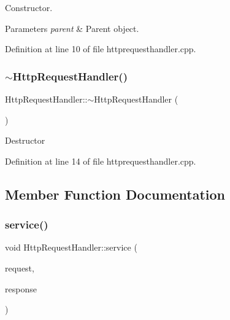 Constructor. 
\begin{DoxyParams}{Parameters}
{\em parent} & Parent object. \\
\hline
\end{DoxyParams}


Definition at line 10 of file httprequesthandler.\+cpp.

\mbox{\label{classstefanfrings_1_1_http_request_handler_a32bf6b0e36dbdb4cd0525d2c4b54fdec}} 
\subsubsection{\texorpdfstring{$\sim$\+Http\+Request\+Handler()}{~HttpRequestHandler()}}
{\footnotesize\ttfamily Http\+Request\+Handler\+::$\sim$\+Http\+Request\+Handler (\begin{DoxyParamCaption}{ }\end{DoxyParamCaption})\hspace{0.3cm}{\ttfamily [virtual]}}

Destructor 

Definition at line 14 of file httprequesthandler.\+cpp.



\subsection{Member Function Documentation}
\mbox{\label{classstefanfrings_1_1_http_request_handler_a0a7210907152c46b8b5a47feb64cf6bd}} 
\subsubsection{\texorpdfstring{service()}{service()}}
{\footnotesize\ttfamily void Http\+Request\+Handler\+::service (\begin{DoxyParamCaption}\item[{\mbox{\hyperlink{classstefanfrings_1_1_http_request}{Http\+Request}} \&}]{request,  }\item[{\mbox{\hyperlink{classstefanfrings_1_1_http_response}{Http\+Response}} \&}]{response }\end{DoxyParamCaption})\hspace{0.3cm}{\ttfamily [virtual]}}

